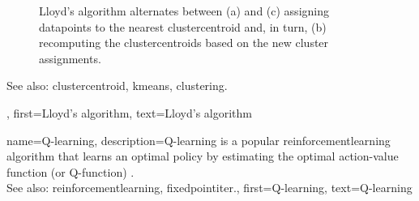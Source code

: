 {{\begin{figure}[H]
\begin{center}
			\end{center}
		\caption{Lloyd's \gls{algorithm} alternates between (a) and (c) assigning \glspl{datapoint} to 
			the nearest \gls{clustercentroid} and, in turn, (b) recomputing the \glspl{clustercentroid} 
			based on the new \gls{cluster} assignments. 
			\label{fig_lloyd_algorithm_dict}}
		\end{figure}
		See also: \gls{clustercentroid}, \gls{kmeans}, \gls{clustering}.},
	first={Lloyd's algorithm},
	text={Lloyd's algorithm} 
}

{name={Q-learning}, 
	description={Q-learning is a popular \gls{reinforcementlearning} 
	     	\gls{algorithm} that learns an optimal \gls{policy} by estimating the optimal \gls{action}-value 
		\gls{function} (or Q-\gls{function}) \cite{SuttonEd2}.  
		\\
		See also: \gls{reinforcementlearning}, \gls{fixedpointiter}.},
	first={Q-learning},
	text={Q-learning} 
}

